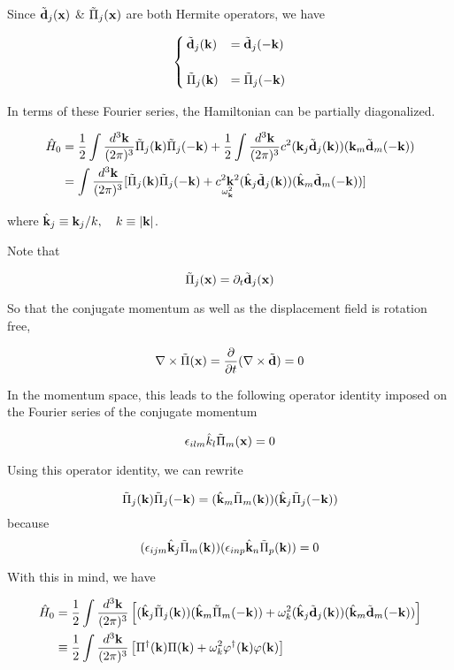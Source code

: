 Since $\tilde{\bf d}_j({\bf x})$ \& $\tilde{\Pi}_j({\bf x})$ are both Hermite operators, we have

\[\begin{cases}
\tilde{\bf d}_j({\bf k}) &= \tilde{\bf d}_j({-\bf k})\\
\ & \\
\tilde{\Pi}_j({\bf k}) &= \tilde{\Pi}_j(-\bf k)
\end{cases}\]

In terms of these Fourier series, the Hamiltonian can be partially diagonalized. 

\[\begin{split}
\hat{H}_0 &= \frac{1}{2}\int\frac{d^3{\bf k}}{(2\pi)^3}\tilde{\Pi}_j({\bf k})\tilde{\Pi}_j({-\bf k}) + \frac{1}{2}\int\frac{d^3{\bf k}}{(2\pi)^3} c^2({\bf k}_j\tilde{\bf d}_j({\bf k}))({\bf k}_m\tilde{\bf d}_m(-{\bf k}))\\
&=\int\frac{d^3{\bf k}}{(2\pi)^3}[\tilde{\Pi}_j({\bf k})\tilde{\Pi}_j({-\bf k})+\underset{\omega_{\bf k}^2}{c^2{\bf k}^2}(\hat{\bf k}_j\tilde{\bf d}_j({\bf k}))(\hat{\bf k}_m\tilde{\bf d}_m(-{\bf k}))]
\end{split}\]

where $\hat{\bf k}_j \equiv {\bf k}_j/k,\quad k\equiv|\bf k|$. 

Note that

\[\tilde{\Pi}_j({\bf x}) = \partial_t\tilde{\bf d}_j(\bf x) \]

So that the conjugate momentum as well as the displacement field is rotation free, 

\[\nabla\times\tilde{\Pi}({\bf x}) = \frac{\partial}{\partial t}(\nabla\times\tilde{\bf d}) = 0 \]

In the momentum space, this leads to the following operator identity imposed on the Fourier series of the conjugate momentum

\[\epsilon_{ilm}\hat{k}_l\tilde{\Pi}_m({\bf x}) = 0 \]

Using this operator identity, we can rewrite

\[\tilde{\Pi}_j({\bf k})\tilde{\Pi}_j({\bf -k}) = (\hat{\bf k}_m\tilde{\Pi}_m({\bf k})) (\hat{\bf k}_j\tilde{\Pi}_j({\bf -k})) \]
because
\[(\epsilon_{ijm}\hat{\bf k}_j\tilde{\Pi}_m({\bf k}))(\epsilon_{inp}\hat{\bf k}_n\tilde{\Pi}_p({\bf k})) = 0 \]

With this in mind, we have

\[\begin{split}
\hat{H}_0 &=\frac{1}{2}\int\frac{d^3{\bf k}}{(2\pi)^3}\left[(\hat{\bf k}_j\tilde{\Pi}_j({\bf k})) (\hat{\bf k}_m\tilde{\Pi}_m({\bf -k})) + \omega_k^2 (\hat{\bf k}_j\tilde{\bf d}_j({\bf k}))(\hat{\bf k}_m\tilde{\bf d}_m(-{\bf k}))\right]\\
&\equiv \frac{1}{2}\int\frac{d^3{\bf k}}{(2\pi)^3}\left[\Pi^\dagger({\bf k})\Pi({\bf k}) + \omega_k^2\varphi^\dagger({\bf k})\varphi({\bf k})\right]
\end{split}\]

